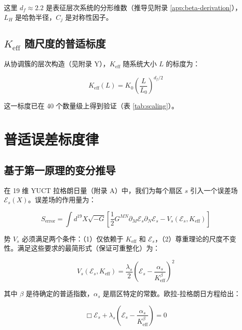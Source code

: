 \documentclass[12pt,a4paper]{article}
\theoremstyle{remark}
\newcommand{\Keff}{K_{\mathrm{eff}}}
\newcommand{\df}{d_{\!f}}
\begin{document}
	这里 $\df \approx 2.2$ 是表征层次系统的分形维数（推导见附录 \ref{app:beta-derivation}），$L_H$ 是哈勃半径，$C_j$ 是对称性因子。
	
	\subsection{$\Keff$ 随尺度的普适标度}
	
	从协调簇的层次构造（见附录 Y），$\Keff$ 随系统大小 $L$ 的标度为：
	
	\begin{equation}
		\Keff(L) = K_0 \left(\frac{L}{L_0}\right)^{\df/2}
		\label{eq:keff-scaling}
	\end{equation}
	
	这一标度已在 40 个数量级上得到验证（表 \ref{tab:scaling}）。
	
	\section{普适误差标度律}
	\label{sec:error-law}
	
	\subsection{基于第一原理的变分推导}
	
	在 19 维 YUCT 拉格朗日量（附录 A）中，我们为每个扇区 $s$ 引入一个误差场 $\mathcal{E}_s(X)$。误差场的作用量为：
	
	\begin{equation}
		S_{\text{error}} = \int d^{19}X \sqrt{-G} \left[ \frac{1}{2} G^{MN} \partial_M \mathcal{E}_s \partial_N \mathcal{E}_s - V_s(\mathcal{E}_s, \Keff) \right]
		\label{eq:error-action}
	\end{equation}
	
	势 $V_s$ 必须满足两个条件：（1）仅依赖于 $\Keff$ 和 $\mathcal{E}_s$，（2）尊重理论的尺度不变性。满足这些要求的最简形式（保证可重整化）为：
	
	\begin{equation}
		V_s(\mathcal{E}_s, \Keff) = \frac{\lambda_s}{2} \left( \mathcal{E}_s - \frac{\alpha_s}{\Keff^{\beta}} \right)^2
		\label{eq:error-potential}
	\end{equation}
	
	其中 $\beta$ 是待确定的普适指数，$\alpha_s$ 是扇区特定的常数。欧拉-拉格朗日方程给出：
	
	\begin{equation}
		\Box \mathcal{E}_s + \lambda_s \left( \mathcal{E}_s - \frac{\alpha_s}{\Keff^{\beta}} \right) = 0
		\label{eq:error-eom}
	\end{equation}
	
\end{document}
